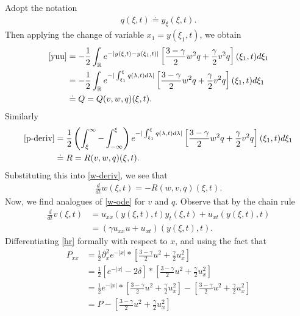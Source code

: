 \documentclass[12pt,reqno]{amsart}
\numberwithin{equation}{section}  %
\numberwithin{figure}{section}
\newcommand{\rr}{\mathbb{R}}
\newcommand{\p}{\partial}
\begin{document}
%
%
Adopt the notation 
%
%
\begin{equation*}
\begin{split}
q(\xi, t) \doteq y_{\xi}(\xi, t).
\end{split}
\end{equation*}
%
%
Then applying the change of variable $x_{1} = y(\xi_{1}, t)$, we obtain
%
%
\begin{equation*}
\begin{split}
\eqref{yuu} & = -\frac{1}{2} \int_{\rr} e^{-| y(\xi, t) - y(\xi_{1}, t) |} \left [
\frac{3 -\gamma}{2} w^{2}q + \frac{\gamma}{2} v^{2} q  \right ](\xi_{1}, t) d \xi_{1}
\\
& = -\frac{1}{2} \int_{\rr} e^{-| \int_{\xi_{1}}^{\xi} q(\lambda, t) d \lambda |} \left [
\frac{3 -\gamma}{2} w^{2}q + \frac{\gamma}{2} v^{2} q  \right ](\xi_{1}, t) d \xi_{1}
\\
& \doteq Q = Q(v, w, q)(\xi, t).
\end{split}
\end{equation*}
%
%
Similarly
%
%
\begin{equation}
\label{R-def}
\begin{split}
\eqref{p-deriv} & = \frac{1}{2} \left ( \int_{\xi}^{\infty} -
\int_{-\infty}^{\xi} \right ) e^{-| \int_{\xi_{1}}^{\xi} q(\lambda, t) d \lambda 
|} \left [ \frac{3 - \gamma}{2} w^{2} q + \frac{\gamma}{2} v^{2} q \right ] (\xi_{1}, t) d \xi_{1}
\\
& \doteq R = R(v, w, q)(\xi, t). 
\end{split}
\end{equation}
%
Substituting this into \eqref{w-deriv}, we see that
%
%
\begin{equation}
\label{w-ode}
\begin{split}
\frac{d}{dt}w(\xi, t) = -R(w, v, q)(\xi, t).
\end{split}
\end{equation}
%
%
Now, we find analogues of \eqref{w-ode} for $v$ and $q$. Observe that by the
chain rule 
%
\begin{equation}
\label{lkk}
\begin{split}
\frac{d}{dt}v(\xi, t)
&  = u_{xx}(y(\xi, t), t) y_{t}(\xi, t) + u_{xt}(y(\xi, t), t)
\\
& =  (\gamma u_{xx}u + u_{xt})(y(\xi, t), t).
\end{split}
\end{equation}
%
Differentiating \eqref{hr} formally with respect to $x$,
and using the fact that
%
%
\begin{equation*}
\begin{split}
P_{xx}
&  = \frac{1}{2} \p_{x}^{2}e^{-| x |}* \left [ \frac{3 - \gamma}{2}u^{2} + \frac{\gamma}{2} u_{x}^{2} \right ] 
\\
& = \frac{1}{2} \left [ e^{-| x |} - 2 \delta \right ] * \left [ \frac{3 - \gamma}{2}u^{2} + \frac{\gamma}{2} u_{x}^{2} \right ] 
\\
& = \frac{1}{2} e^{-| x |} * \left [ \frac{3 - \gamma}{2}u^{2} +
\frac{\gamma}{2} u_{x}^{2} \right ] - \left [ \frac{3 -
\gamma}{2}u^{2} + \frac{\gamma}{2} u_{x}^{2} \right ] 
\\
& = P - \left [ \frac{3 -
\gamma}{2}u^{2} + \frac{\gamma}{2} u_{x}^{2} \right ] 
\end{split}
\end{equation*}
\end{document}
